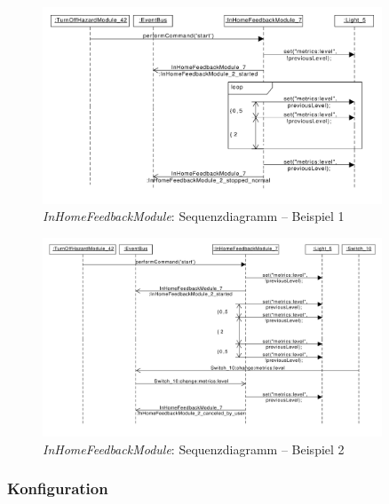 \begin{figure}[h!]
	\centering
	\includegraphics[width=0.9\textwidth]{img/Modulkonzeption/FeedbackSequence.pdf}
	\caption{\emph{InHomeFeedbackModule}: Sequenzdiagramm – Beispiel 1}
	\label{fig:feedbackSequence}
\end{figure}

\begin{figure}[h!]
	\centering
	\includegraphics[width=0.9\textwidth]{img/Modulkonzeption/FeedbackSequenceUser.pdf}
	\caption{\emph{InHomeFeedbackModule}: Sequenzdiagramm – Beispiel 2}
	\label{fig:feedbackSequenceUser}
\end{figure}

\newpage

\subsubsection{Konfiguration}

